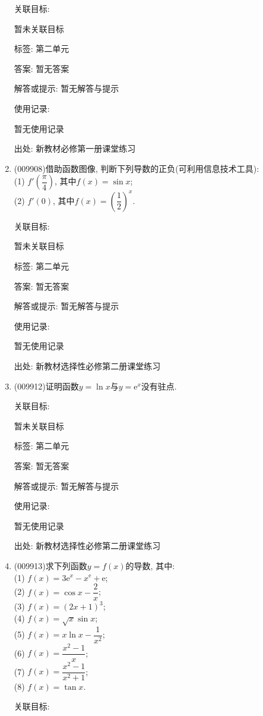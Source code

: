 \documentclass[10pt,a4paper]{article}
\begin{document}
\begin{enumerate}[1.]
关联目标:

暂未关联目标



标签: 第二单元

答案: 暂无答案

解答或提示: 暂无解答与提示

使用记录:

暂无使用记录


出处: 新教材必修第一册课堂练习
\item { (009908)}借助函数图像, 判断下列导数的正负(可利用信息技术工具):\\
(1) $f'(\dfrac\pi 4)$, 其中$f(x)=\sin x$;\\
(2) $f'(0)$, 其中$f(x)=(\dfrac 12)^x$.


关联目标:

暂未关联目标



标签: 第二单元

答案: 暂无答案

解答或提示: 暂无解答与提示

使用记录:

暂无使用记录


出处: 新教材选择性必修第二册课堂练习
\item { (009912)}证明函数$y=\ln x$与$y=\mathrm{e}^x$没有驻点.


关联目标:

暂未关联目标



标签: 第二单元

答案: 暂无答案

解答或提示: 暂无解答与提示

使用记录:

暂无使用记录


出处: 新教材选择性必修第二册课堂练习
\item { (009913)}求下列函数$y=f(x)$的导数, 其中:\\
(1) $f(x)=3\mathrm{e}^x-x^{\mathrm{e}}+\mathrm{e}$;\\
(2) $f(x)=\cos x-\dfrac 2x$;\\
(3) $f(x)=(2x+1)^3$;\\
(4) $f(x)=\sqrt x\sin x$;\\
(5) $f(x)=x\ln x-\dfrac1{x^2}$;\\
(6) $f(x)=\dfrac{x^2-1}x$;\\
(7) $f(x)=\dfrac{x^2-1}{x^2+1}$;\\
(8) $f(x)=\tan x$.


关联目标:


\end{enumerate}
\end{document}
